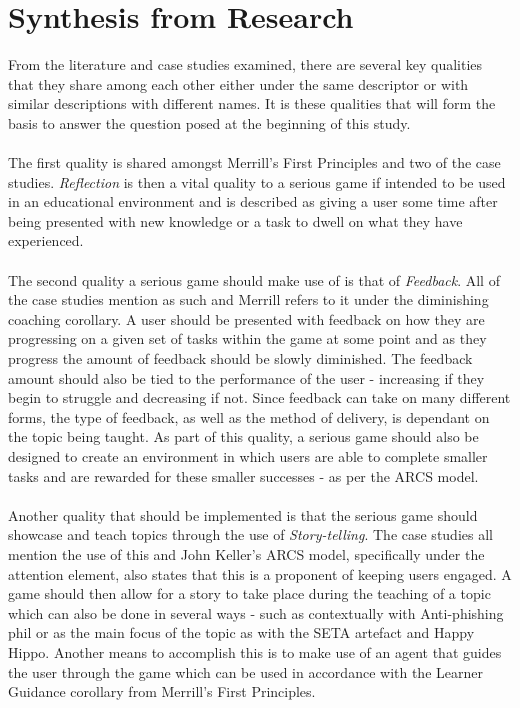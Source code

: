\documentclass[conference]{IEEEtran}
\begin{document}
\section{Synthesis from Research}
From the literature and case studies examined, there are several key qualities that they share among each other either under the same descriptor or with similar descriptions with different names. It is these qualities that will form the basis to answer the question posed at the beginning of this study.
\\\\
The first quality is shared amongst Merrill's First Principles\cite{Merrill2002} and two of the case studies\cite{Dincelli2020,Sheng2007}. \textit{Reflection} is then a vital quality to a serious game if intended to be used in an educational environment and is described as giving a user some time after being presented with new knowledge or a task to dwell on what they have experienced.
\\\\
The second quality a serious game should make use of is that of \textit{Feedback}. All of the case studies\cite{Dincelli2020,Sheng2007,allers2021children} mention as such and Merrill\cite{Merrill2002} refers to it under the diminishing coaching corollary. A user should be presented with feedback on how they are progressing on a given set of tasks within the game at some point and as they progress the amount of feedback should be slowly diminished. The feedback amount should also be tied to the performance of the user - increasing if they begin to struggle and decreasing if not. Since feedback can take on many different forms, the type of feedback, as well as the method of delivery, is dependant on the topic being taught. As part of this quality, a serious game should also be designed to create an environment in which users are able to complete smaller tasks and are rewarded for these smaller successes - as per the ARCS model\cite{keller1987development}.
\\\\
Another quality that should be implemented is that the serious game should showcase and teach topics through the use of \textit{Story-telling}. The case studies\cite{Dincelli2020,Sheng2007,allers2021children} all mention the use of this and John Keller's ARCS model\cite{keller1987development}, specifically under the attention element, also states that this is a proponent of keeping users engaged. A game should then allow for a story to take place during the teaching of a topic which can also be done in several ways - such as contextually with Anti-phishing phil or as the main focus of the topic as with the SETA artefact\cite{Dincelli2020} and Happy Hippo\cite{allers2021children}. Another means to accomplish this is to make use of an agent that guides the user through the game which can be used in accordance with the Learner Guidance corollary from Merrill's First Principles\cite{Merrill2002}. 
\end{document}
